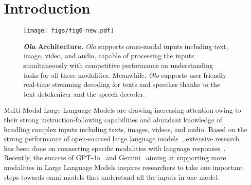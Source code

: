 \section{Introduction}
\label{sec:intro}

\begin{figure*}[t]
\centering
\texttt{[image: figs/fig0-new.pdf]} 
\caption{\textbf{\textit{Ola} Architecture. }\textit{Ola} supports omni-modal inputs including text, image, video, and audio, capable of processing the inputs simultaneously with competitive performance on understanding tasks for all these modalities. Meanwhile, \textit{Ola} supports user-friendly real-time streaming decoding for texts and speeches thanks to the text detokenizer and the speech decoder. }
\label{fig:sota}
\end{figure*}

Multi-Modal Large Language Models are drawing increasing attention owing to their strong instruction-following capabilities and abundant knowledge of handling complex inputs including texts, images, videos, and audio. Based on the strong performance of open-sourced large language models~\citep{qwen2,young2024yi}, extensive research has been done on connecting specific modalities with language responses~\citep{tong2024cambrian,li2024llavaov,chen2024internvl,qwen2vl,lin2023videollava,qian2024streaming}. Recently, the success of GPT-4o~\citep{GPT4o} and Gemini~\citep{reid2024gemini} aiming at supporting more modalities in Large Language Models inspires researchers to take one important steps towards omni models that understand all the inputs in one model. 

